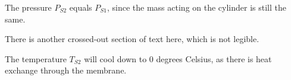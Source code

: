 The pressure \( P_{S2} \) equals \( P_{S1} \), since the mass acting on the cylinder is still the same.

There is another crossed-out section of text here, which is not legible.

The temperature \( T_{S2} \) will cool down to 0 degrees Celsius, as there is heat exchange through the membrane.